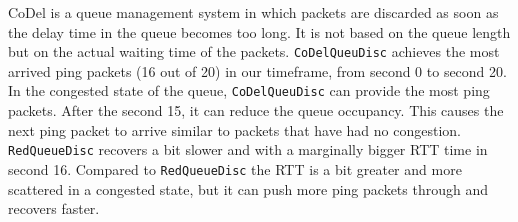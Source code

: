 \documentclass{article}
\begin{document}
    
    CoDel is a queue management system in which packets are discarded as soon as the delay time in the queue becomes too long. It is not based on the queue length but on the actual waiting time of the packets.
    \texttt{CoDelQueuDisc} achieves the most arrived ping packets (16 out of 20) in our timeframe, from second 0 to second 20.
    In the congested state of the queue, \texttt{CoDelQueuDisc} can provide the most ping packets. 
    After the second 15, it can reduce the queue occupancy. This causes the next ping packet to arrive similar to packets that have had no congestion. \texttt{RedQueueDisc} recovers a bit slower and with a marginally bigger RTT time in second 16. Compared to \texttt{RedQueueDisc} the RTT is a bit greater and more scattered in a congested state, but it can push more ping packets through and recovers faster.  
    
    
\end{document}
